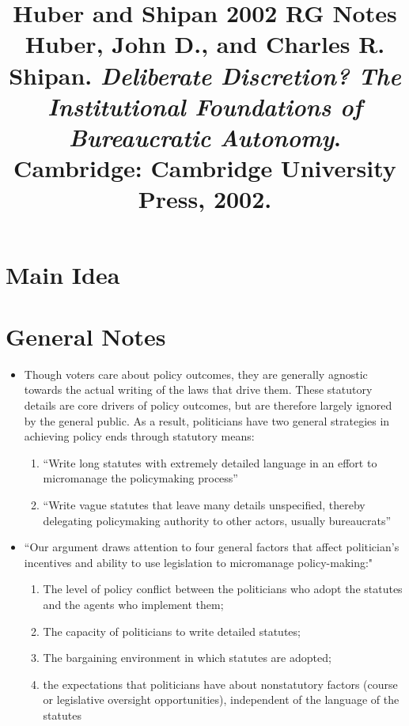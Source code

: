 \documentclass[12pt]{article}
\title{\textbf{Huber and Shipan 2002 RG Notes}\\
\large Huber, John D., and Charles R. Shipan. \textit{Deliberate Discretion? The Institutional Foundations of Bureaucratic Autonomy}.\\
Cambridge: Cambridge University Press, 2002.}
\author{}
\date{}
\begin{document}
\maketitle

\section{Main Idea}



\section{General Notes}

\begin{itemize}[leftmargin=*, itemsep=4pt]
    \item Though voters care about policy outcomes, they are generally agnostic towards the actual writing of the laws that drive them. These statutory details are core drivers of policy outcomes, but are therefore largely ignored by the general public. As a result, politicians have two general strategies in achieving policy ends through statutory means:
    \begin{enumerate}
        \item ``Write long statutes with extremely detailed language in an effort to micromanage the policymaking process''
        \item ``Write vague statutes that leave many details unspecified, thereby delegating policymaking authority to other actors, usually bureaucrats''
    \end{enumerate}
    \item ``Our argument draws attention to four general factors that affect politician's incentives and ability to use legislation to micromanage policy-making:"
    \begin{enumerate}
        \item The level of policy conflict between the politicians who adopt the statutes and the agents who implement them;
        \item The capacity of politicians to write detailed statutes;
        \item The bargaining environment in which statutes are adopted;
        \item the expectations that politicians have about nonstatutory factors (course or legislative oversight opportunities), independent of the language of the statutes

\end{enumerate}
\end{itemize}
\end{document}
